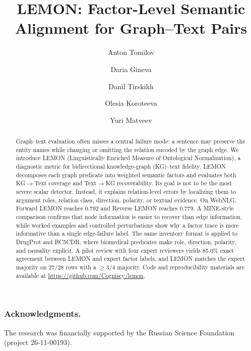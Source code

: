 \documentclass[runningheads]{llncs}
\newcommand{\lemonscore}{\textsc{LEMON}}
\newcommand{\minebase}{\textsc{MINE}-style}
\begin{document}
\title{LEMON: Factor-Level Semantic Alignment for Graph--Text Pairs}
\author{Anton Tomilov \and Daria Gineva \and Danil Tirskikh \and Olesia Koroteeva \and Yuri Matveev}
\maketitle

\begin{abstract}
Graph--text evaluation often misses a central failure mode: a sentence may preserve the entity names while changing or omitting the relation encoded by the graph edge. We introduce \lemonscore{} (Linguistically Enriched Measure of Ontological Normalization), a diagnostic metric for bidirectional knowledge-graph (KG)--text fidelity. \lemonscore{} decomposes each graph predicate into weighted semantic factors and evaluates both KG$\rightarrow$Text coverage and Text$\rightarrow$KG recoverability. Its goal is not to be the most severe scalar detector. Instead, it explains relation-level errors by localizing them to argument roles, relation class, direction, polarity, or textual evidence. On WebNLG, Forward \lemonscore{} reaches 0.792 and Reverse \lemonscore{} reaches 0.779. A \minebase{} comparison confirms that node information is easier to recover than edge information, while worked examples and controlled perturbations show why a factor trace is more informative than a single edge-failure label. The same inventory format is applied to DrugProt and BC5CDR, where biomedical predicates make role, direction, polarity, and causality explicit. A pilot review with four expert reviewers yields 85.0\% exact agreement between LEMON and expert factor labels, and LEMON matches the expert majority on 27/28 rows with a $\geq$3/4 majority. Code and reproducibility materials are available at \url{https://github.com/Cogniscy/lemon}.
\end{abstract}









\subsubsection*{Acknowledgments.}
The research was financially supported by the Russian Science Foundation (project 26-11-00193).

\end{document}
